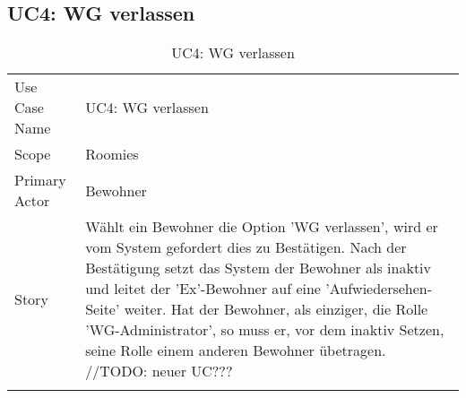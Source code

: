 \subsection{UC4: WG verlassen}
\begin{table}[H]
	\tablestyle
	\tablealtcolored
	\begin{tabularx}{\textwidth}{lX}
		\tablebody
			Use Case Name &
			UC4: WG verlassen
			\tabularnewline
			Scope &
			Roomies
			\tabularnewline
			Primary Actor &
			Bewohner
			\tabularnewline
			Story &
			Wählt ein Bewohner die Option 'WG verlassen', wird er vom System gefordert dies zu Bestätigen. Nach der Bestätigung setzt das System der Bewohner als inaktiv und leitet der 'Ex'-Bewohner auf eine 'Aufwiedersehen-Seite' weiter. \newline
			Hat der Bewohner, als einziger, die Rolle 'WG-Administrator', so muss er, vor dem inaktiv Setzen, seine Rolle einem anderen Bewohner übetragen. //TODO: neuer UC???
			\tabularnewline
		\tableend
	\end{tabularx}
	\caption{UC4: WG verlassen}
\end{table}


